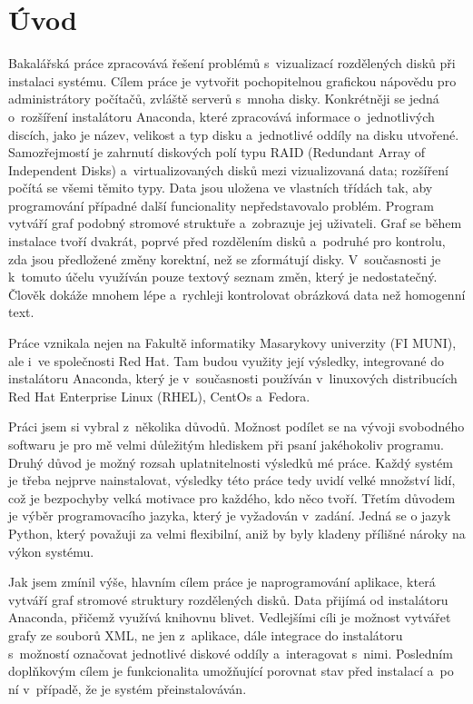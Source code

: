 \documentclass[color,table,oneside,nolot,nolof]{fithesis}
\begin{document}
\chapter{Úvod}
	Bakalářská práce zpracovává řešení problémů s~vizualizací rozdělených disků při instalaci systému. Cílem práce je vytvořit pochopitelnou grafickou nápovědu pro administrátory 
	počítačů, zvláště serverů s~mnoha disky. 
	Konkrétněji se jedná o~rozšíření instalátoru Anaconda, které zpracovává informace o~jednotlivých discích, jako je název, velikost a typ disku a~jednotlivé oddíly na disku utvořené. 
	Samozřejmostí je zahrnutí 
	diskových polí typu RAID (Redundant Array of Independent Disks)  a~virtualizovaných disků mezi vizualizovaná data; rozšíření počítá se všemi těmito typy. Data jsou uložena 
	ve vlastních třídách tak, aby programování případné další funcionality 
	nepředstavovalo problém. Program vytváří graf podobný stromové struktuře a~zobrazuje jej uživateli. Graf se během instalace tvoří dvakrát, poprvé
	před rozdělením disků a~podruhé pro kontrolu, zda jsou předložené změny korektní, než se zformátují disky. V~současnosti je k~tomuto účelu využíván pouze textový 
	seznam změn, který je nedostatečný. Člověk dokáže mnohem lépe a~rychleji kontrolovat obrázková data než homogenní text. 

	Práce vznikala nejen na Fakultě informatiky Masarykovy univerzity (FI MUNI), ale i~ve společnosti Red Hat. Tam budou využity její výsledky,
	integrované do instalátoru Anaconda, který je v~současnosti používán v~linuxových distribucích Red Hat Enterprise Linux (RHEL), CentOs a~Fedora.

	Práci jsem si vybral z~několika důvodů.  Možnost podílet se na vývoji svobodného softwaru je pro mě velmi důležitým hlediskem 
	při psaní jakéhokoliv programu. Druhý důvod je možný rozsah uplatnitelnosti výsledků mé práce. Každý systém je třeba nejprve nainstalovat, výsledky
	této práce tedy uvidí velké množství lidí, což je bezpochyby velká motivace pro každého, kdo něco tvoří. Třetím důvodem je výběr programovacího jazyka, který je vyžadován 
	v~zadání. Jedná se o jazyk Python, který považuji za velmi flexibilní, aniž by byly kladeny přílišné nároky na výkon systému. 

	Jak jsem zmínil výše, hlavním cílem práce je naprogramování aplikace, která vytváří graf stromové struktury rozdělených disků. Data přijímá od instalátoru Anaconda, 
	přičemž využívá knihovnu blivet. 
	Vedlejšími cíli je možnost vytvářet grafy ze souborů XML, ne jen z~aplikace, dále integrace do instalátoru s~možností označovat jednotlivé diskové oddíly a~interagovat
	s~nimi. Posledním doplňkovým cílem je funkcionalita umožňující porovnat stav před instalací a~po ní v~případě, že je systém přeinstalováván.
\end{document}
